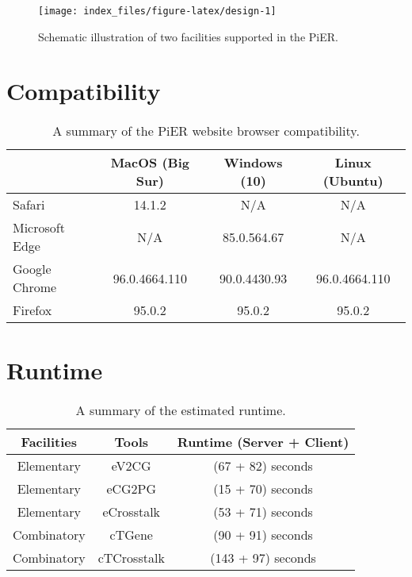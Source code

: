\documentclass[
  oneside]{book}
\begin{document}
\begin{figure}

{\centering \texttt{[image: index\_files/figure-latex/design-1]} 

}

\caption{Schematic illustration of two facilities supported in the PiER.}\label{fig:design}
\end{figure}

\hypertarget{compatibility}{%
\chapter{Compatibility}\label{compatibility}}

\begin{table}

\caption{\label{tab:unnamed-chunk-3}A summary of the PiER website browser compatibility.}
\centering
\begin{tabular}[t]{l|c|c|c}
\hline
  & MacOS (Big Sur) & Windows (10) & Linux (Ubuntu)\\
\hline
Safari & 14.1.2 & N/A & N/A\\
\hline
Microsoft Edge & N/A & 85.0.564.67 & N/A\\
\hline
Google Chrome & 96.0.4664.110 & 90.0.4430.93 & 96.0.4664.110\\
\hline
Firefox & 95.0.2 & 95.0.2 & 95.0.2\\
\hline
\end{tabular}
\end{table}

\hypertarget{runtime}{%
\chapter{Runtime}\label{runtime}}

\begin{table}

\caption{\label{tab:unnamed-chunk-4}A summary of the estimated runtime.}
\centering
\begin{tabular}[t]{c|c|c}
\hline
Facilities & Tools & Runtime (Server + Client)\\
\hline
Elementary & eV2CG & (67 + 82) seconds\\
\hline
Elementary & eCG2PG & (15 + 70) seconds\\
\hline
Elementary & eCrosstalk & (53 + 71) seconds\\
\hline
Combinatory & cTGene & (90 + 91) seconds\\
\hline
Combinatory & cTCrosstalk & (143 + 97) seconds\\
\hline
\end{tabular}
\end{table}
\end{document}
